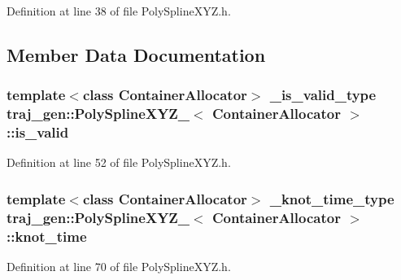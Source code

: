 Definition at line 38 of file Poly\+Spline\+X\+Y\+Z.\+h.



\subsection{Member Data Documentation}
\subsubsection[{\texorpdfstring{is\+\_\+valid}{is_valid}}]{\setlength{\rightskip}{0pt plus 5cm}template$<$class Container\+Allocator$>$ {\bf \+\_\+is\+\_\+valid\+\_\+type} {\bf traj\+\_\+gen\+::\+Poly\+Spline\+X\+Y\+Z\+\_\+}$<$ Container\+Allocator $>$\+::is\+\_\+valid}\hypertarget{structtraj__gen_1_1_poly_spline_x_y_z___a372cfda50d7d422fa234a2f8ebec21ee}{}\label{structtraj__gen_1_1_poly_spline_x_y_z___a372cfda50d7d422fa234a2f8ebec21ee}


Definition at line 52 of file Poly\+Spline\+X\+Y\+Z.\+h.

\subsubsection[{\texorpdfstring{knot\+\_\+time}{knot_time}}]{\setlength{\rightskip}{0pt plus 5cm}template$<$class Container\+Allocator$>$ {\bf \+\_\+knot\+\_\+time\+\_\+type} {\bf traj\+\_\+gen\+::\+Poly\+Spline\+X\+Y\+Z\+\_\+}$<$ Container\+Allocator $>$\+::knot\+\_\+time}\hypertarget{structtraj__gen_1_1_poly_spline_x_y_z___a3b5c7122e5190c87c753419d12d526b2}{}\label{structtraj__gen_1_1_poly_spline_x_y_z___a3b5c7122e5190c87c753419d12d526b2}


Definition at line 70 of file Poly\+Spline\+X\+Y\+Z.\+h.

